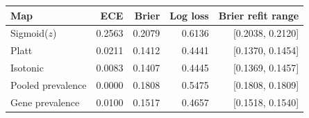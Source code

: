 \begin{tabular}{lrrrr}
\toprule
Map & ECE & Brier & Log loss & Brier refit range \\
\midrule
Sigmoid($z$) & 0.2563 & 0.2079 & 0.6136 & [0.2038, 0.2120] \\
Platt & 0.0211 & 0.1412 & 0.4441 & [0.1370, 0.1454] \\
Isotonic & 0.0083 & 0.1407 & 0.4445 & [0.1369, 0.1457] \\
Pooled prevalence & 0.0000 & 0.1808 & 0.5475 & [0.1808, 0.1809] \\
Gene prevalence & 0.0100 & 0.1517 & 0.4657 & [0.1518, 0.1540] \\
\bottomrule
\end{tabular}
